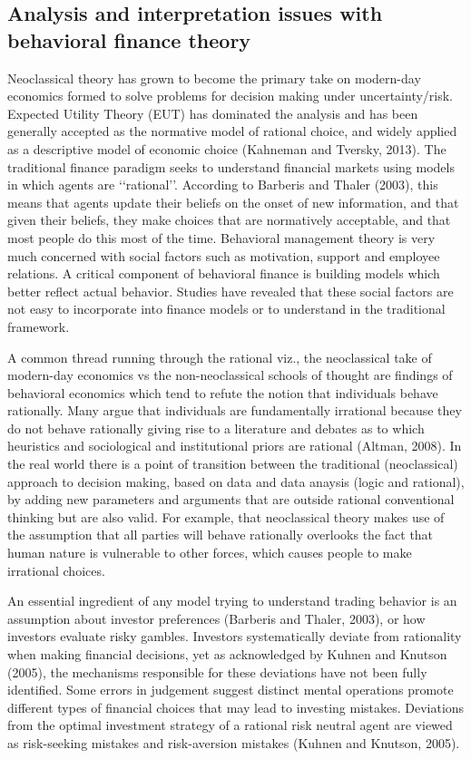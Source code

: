 \documentclass[]{DissertateUSU}
\begin{document}
\subsection{Analysis and interpretation issues with behavioral finance theory}

Neoclassical theory has grown to become the primary take on modern-day
economics formed to solve problems for decision making under
uncertainty/risk. Expected Utility Theory (EUT) has dominated the
analysis and has been generally accepted as the normative model of
rational choice, and widely applied as a descriptive model of economic
choice (Kahneman and Tversky, 2013). The traditional finance paradigm
seeks to understand financial markets using models in which agents are
\lq\lq rational\rq\rq. According to Barberis and Thaler (2003), this
means that agents update their beliefs on the onset of new information,
and that given their beliefs, they make choices that are normatively
acceptable, and that most people do this most of the time. Behavioral
management theory is very much concerned with social factors such as
motivation, support and employee relations. A critical component of
behavioral finance is building models which better reflect actual
behavior. Studies have revealed that these social factors are not easy
to incorporate into finance models or to understand in the traditional
framework.\medskip 

A common thread running through the rational viz., the neoclassical take
of modern-day economics vs the non-neoclassical schools of thought are
findings of behavioral economics which tend to refute the notion that
individuals behave rationally. Many argue that individuals are
fundamentally irrational because they do not behave rationally giving
rise to a literature and debates as to which heuristics and sociological
and institutional priors are rational (Altman, 2008). In the real world
there is a point of transition between the traditional (neoclassical)
approach to decision making, based on data and data anaysis (logic and
rational), by adding new parameters and arguments that are outside
rational conventional thinking but are also valid. For example, that
neoclassical theory makes use of the assumption that all parties will
behave rationally overlooks the fact that human nature is vulnerable to
other forces, which causes people to make irrational choices.\medskip 

An essential ingredient of any model trying to understand trading
behavior is an assumption about investor preferences (Barberis and
Thaler, 2003), or how investors evaluate risky gambles. Investors
systematically deviate from rationality when making financial decisions,
yet as acknowledged by Kuhnen and Knutson (2005), the mechanisms
responsible for these deviations have not been fully identified. Some
errors in judgement suggest distinct mental operations promote different
types of financial choices that may lead to investing mistakes.
Deviations from the optimal investment strategy of a rational risk
neutral agent are viewed as risk-seeking mistakes and risk-aversion
mistakes (Kuhnen and Knutson, 2005).\medskip 
\end{document}
